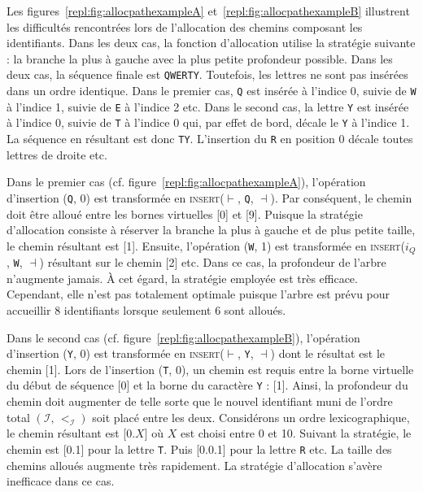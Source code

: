 Les figures~\ref{repl:fig:allocpathexampleA} et~\ref{repl:fig:allocpathexampleB}
illustrent les difficultés rencontrées lors de l'allocation des chemins
composant les identifiants. Dans les deux cas, la fonction d'allocation utilise
la stratégie suivante : la branche la plus à gauche avec la plus petite
profondeur possible. Dans les deux cas, la séquence finale est
\texttt{QWERTY}. Toutefois, les lettres ne sont pas insérées dans un ordre
identique. Dans le premier cas, \texttt{Q} est insérée à l'indice 0, suivie de
\texttt{W} à l'indice 1, suivie de \texttt{E} à l'indice 2 etc.  Dans le second
cas, la lettre \texttt{Y} est insérée à l'indice 0, suivie de \texttt{T} à
l'indice 0 qui, par effet de bord, décale le \texttt{Y} à l'indice 1. La
séquence en résultant est donc \texttt{TY}. L'insertion du \texttt{R} en
position 0 décale toutes lettres de droite etc.

Dans le premier cas (cf. figure~\ref{repl:fig:allocpathexampleA}), l'opération
d'insertion (\texttt{Q}, 0) est transformée en \textsc{insert}($\vdash$,
\texttt{Q}, $\dashv$). Par conséquent, le chemin doit être alloué entre les
bornes virtuelles [0] et [9]. Puisque la stratégie d'allocation consiste à
réserver la branche la plus à gauche et de plus petite taille, le chemin
résultant est [1]. Ensuite, l'opération (\texttt{W}, 1) est transformée en
\textsc{insert}($i_Q$, \texttt{W}, $\dashv$) résultant sur le chemin [2] etc.
Dans ce cas, la profondeur de l'arbre n'augmente jamais. À cet égard, la
stratégie employée est très efficace. Cependant, elle n'est pas totalement
optimale puisque l'arbre est prévu pour accueillir 8 identifiants lorsque
seulement 6 sont alloués.

Dans le second cas (cf. figure~\ref{repl:fig:allocpathexampleB}), l'opération
d'insertion (\texttt{Y}, 0) est transformée en \textsc{insert}($\vdash$,
\texttt{Y}, $\dashv$) dont le résultat est le chemin [1]. Lors de l'insertion
(\texttt{T}, 0), un chemin est requis entre la borne virtuelle du début de
séquence [0] et la borne du caractère \texttt{Y} : [1]. Ainsi, la profondeur du
chemin doit augmenter de telle sorte que le nouvel identifiant muni de l'ordre
total $(\mathcal{I},\,<_\mathcal{I})$ soit placé entre les deux. Considérons un
ordre lexicographique, le chemin résultant est [0.$X$] où $X$ est choisi entre 0
et 10. Suivant la stratégie, le chemin est [0.1] pour la lettre \texttt{T}. Puis
[0.0.1] pour la lettre \texttt{R} etc. La taille des chemins alloués augmente
très rapidement.  La stratégie d'allocation s'avère inefficace dans ce cas.

